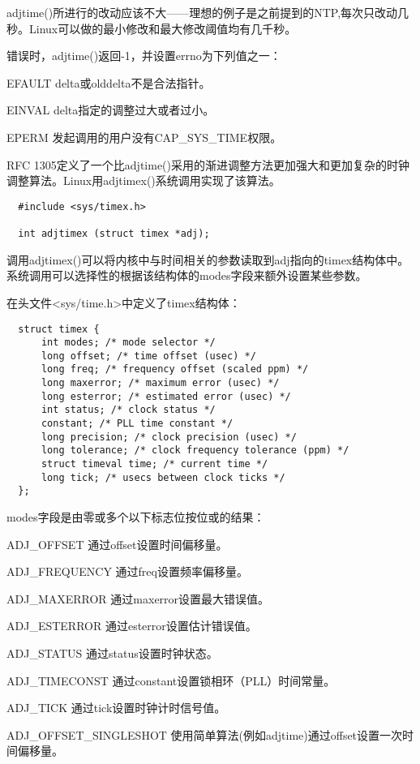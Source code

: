 adjtime()所进行的改动应该不大——理想的例子是之前提到的NTP,每次只改动几秒。Linux可以做的最小修改和最大修改阈值均有几千秒。

错误时，adjtime()返回-1，并设置errno为下列值之一： 

\begin{eqlist*}
\item [EFAULT]
delta或olddelta不是合法指针。 
\item [EINVAL]
delta指定的调整过大或者过小。
\item [EPERM]
发起调用的用户没有CAP\_SYS\_TIME权限。 
\end{eqlist*}

RFC 1305定义了一个比adjtime()采用的渐进调整方法更加强大和更加复杂的时钟调整算法。Linux用adjtimex()系统调用实现了该算法。 

\begin{lstlisting}
  #include <sys/timex.h>

  int adjtimex (struct timex *adj);
\end{lstlisting}

调用adjtimex()可以将内核中与时间相关的参数读取到adj指向的timex结构体中。系统调用可以选择性的根据该结构体的modes字段来额外设置某些参数。

在头文件<sys/time.h>中定义了timex结构体： 

\begin{lstlisting}
  struct timex {
      int modes; /* mode selector */
      long offset; /* time offset (usec) */
      long freq; /* frequency offset (scaled ppm) */
      long maxerror; /* maximum error (usec) */
      long esterror; /* estimated error (usec) */
      int status; /* clock status */
      constant; /* PLL time constant */
      long precision; /* clock precision (usec) */
      long tolerance; /* clock frequency tolerance (ppm) */
      struct timeval time; /* current time */
      long tick; /* usecs between clock ticks */
  };
\end{lstlisting}

modes字段是由零或多个以下标志位按位或的结果： 

\begin{eqlist*}
\item [ADJ\_OFFSET]
通过offset设置时间偏移量。
\item [ADJ\_FREQUENCY]
通过freq设置频率偏移量。 
\item [ADJ\_MAXERROR]
通过maxerror设置最大错误值。
\item [ADJ\_ESTERROR]
通过esterror设置估计错误值。 
\item [ADJ\_STATUS]
通过status设置时钟状态。
\item [ADJ\_TIMECONST]
通过constant设置锁相环（PLL）时间常量。 
\item [ADJ\_TICK]
通过tick设置时钟计时信号值。 
\item [ADJ\_OFFSET\_SINGLESHOT]
使用简单算法(例如adjtime)通过offset设置一次时间偏移量。 
\end{eqlist*}

